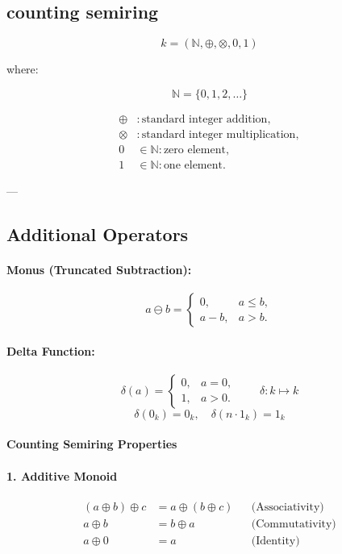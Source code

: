 \subsection{counting semiring}
\begin{toappendix}


\[
k = (\mathbb{N}, \oplus, \otimes, 0, 1)
\]

where:

\[
\mathbb{N} = \{0, 1, 2, \dots\}
\]

\[
\begin{aligned}
\oplus &: \text{standard integer addition}, \\
\otimes &: \text{standard integer multiplication}, \\
0 &\in \mathbb{N} : \text{zero element}, \\
1 &\in \mathbb{N} : \text{one element}.
\end{aligned}
\]

---

\subsection*{Additional Operators}

\paragraph{Monus (Truncated Subtraction):}
\[
a \ominus b = 
\begin{cases}
0, & a \le b, \\
a - b, & a > b.
\end{cases}
\]

\paragraph{Delta Function:}
\[
\delta(a) = 
\begin{cases}
0, & a = 0, \\
1, & a > 0.
\end{cases}
\qquad
\delta : k \mapsto k
\]
\[
\delta(0_k) = 0_k, \quad \delta(n \cdot 1_k) = 1_k
\]

\paragraph{Counting Semiring Properties}

\paragraph{1. Additive Monoid}
\[
\begin{aligned}
(a \oplus b) \oplus c &= a \oplus (b \oplus c) && \text{(Associativity)} \\
a \oplus b &= b \oplus a && \text{(Commutativity)} \\
a \oplus 0 &= a && \text{(Identity)}
\end{aligned}
\]


\end{toappendix}
